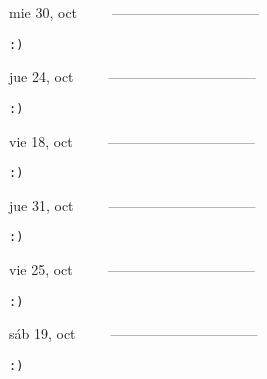 \documentclass[letterpaper,10pt]{article}
\begin{document}
\begin{multicols}{3}
{mie 30, oct\ \ \ \ \ --------------------------------}
\begin{flushright}\begin{small}\texttt{:)}\end{small}\end{flushright}
\vfill
{jue 24, oct\ \ \ \ \ --------------------------------}
\begin{flushright}\begin{small}\texttt{:)}\end{small}\end{flushright}\par
\vfill
{vie 18, oct\ \ \ \ \ --------------------------------}
\begin{flushright}\begin{small}\texttt{:)}\end{small}\end{flushright}\par
\vfill
\end{multicols}
\vspace{1.05cm}

\begin{multicols}{3}
{jue 31, oct\ \ \ \ \ --------------------------------}
\begin{flushright}\begin{small}\texttt{:)}\end{small}\end{flushright}
\vfill
{vie 25, oct\ \ \ \ \ --------------------------------}
\begin{flushright}\begin{small}\texttt{:)}\end{small}\end{flushright}\par
\vfill
{sáb 19, oct\ \ \ \ \ --------------------------------}
\begin{flushright}\begin{small}\texttt{:)}\end{small}\end{flushright}\par
\vfill
\end{multicols}
\vspace{1.05cm}
\end{document}
